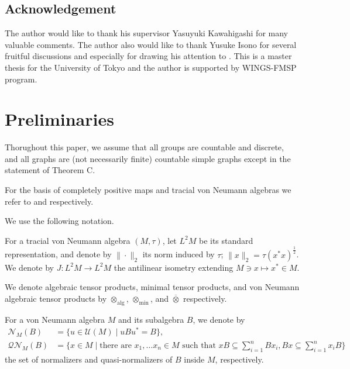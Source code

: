 \documentclass{amsart}
\theoremstyle{definition}
\renewcommand{\subset}{\subseteq}
\newcommand{\mintensor}{\otimes_{\mathrm{min}}}
\newcommand{\bartensor}{\overline{\otimes}}
\newcommand{\algtensor}{\otimes_{\mathrm{alg}}}
\begin{document}

\subsection*{Acknowledgement}
The author would like to thank his supervisor Yasuyuki Kawahigashi for many valuable comments. 
The author also would like to thank Yusuke Isono 
for several fruitful discussions and especially 
for drawing his attention to \cite{hik}. This is a master thesis for the University of Tokyo and the author is supported by WINGS-FMSP program. 





\section{Preliminaries}

Thorughout this paper, we assume that all groups are countable and discrete, and all graphs are (not necessarily finite) countable simple graphs except in the statement of Theorem C. 

For the basis of completely positive maps and tracial von Neumann algebras we refer to \cite{bo}
and \cite{ap} respectively. 

We use the following notation. 

For a tracial von Neumann algebra $(M, \tau)$, let $L^2M$ be its standard representation, and denote by $\| \cdot \|_2$ its norm 
induced by $\tau$; $\| x \|_2 = \tau(x^{\ast}x)^{\frac{1}{2}}$. 
We denote by $J : L^2M \to L^2M$ the antilinear isometry extending 
$M\ni x \mapsto x^{\ast}\in M$.  

We denote algebraic tensor products, minimal tensor products, and von Neumann algebraic tensor products by $\algtensor$, $\mintensor$, and $\bartensor$ respectively. 

For a von Neumann algebra $M$ and its subalgebra $B$, we denote by 
\begin{align}
\mathcal{N}_M(B) &= \{ u\in \mathcal{U}(M) \mid uBu^{\ast}=B \}, \\
\mathcal{QN}_M(B) &= \{ x\in M \mid \text{there are } x_1, \ldots x_n\in M \text{ such that }
xB\subset \sum_{i=1}^n Bx_i, Bx\subset \sum_{i=1}^nx_iB\}
\end{align}
the set of normalizers and quasi-normalizers of $B$ inside $M$,
respectively. 
\end{document}
